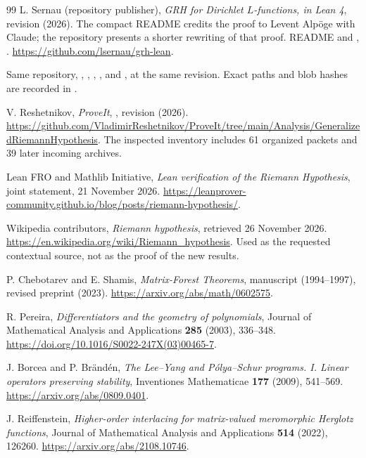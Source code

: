 \begin{thebibliography}{99}
L. Sernau (repository publisher), \emph{GRH for Dirichlet $L$-functions, in Lean 4},
revision  (2026).
The compact README credits the proof to Levent Alp\"oge with Claude;
the repository presents a shorter rewriting of that proof.
README and , .
\url{https://github.com/lsernau/grh-lean}.

Same repository, , ,
,
, and
, at the same revision.
Exact paths and blob hashes are recorded in .

V. Reshetnikov, \emph{ProveIt}, ,
revision  (2026).
\url{https://github.com/VladimirReshetnikov/ProveIt/tree/main/Analysis/GeneralizedRiemannHypothesis}.
The inspected inventory includes 61 organized packets and 39 later incoming archives.

Lean FRO and Mathlib Initiative, \emph{Lean verification of the Riemann
Hypothesis}, joint statement, 21 November 2026.
\url{https://leanprover-community.github.io/blog/posts/riemann-hypothesis/}.

Wikipedia contributors, \emph{Riemann hypothesis}, retrieved 26 November 2026.
\url{https://en.wikipedia.org/wiki/Riemann_hypothesis}.
Used as the requested contextual source, not as the proof of the new results.

P. Chebotarev and E. Shamis, \emph{Matrix-Forest Theorems},
manuscript (1994--1997), revised preprint (2023).
\url{https://arxiv.org/abs/math/0602575}.

R. Pereira, \emph{Differentiators and the geometry of polynomials},
Journal of Mathematical Analysis and Applications \textbf{285} (2003), 336--348.
\url{https://doi.org/10.1016/S0022-247X(03)00465-7}.

J. Borcea and P. Br\"and\'en, \emph{The Lee--Yang and P\'olya--Schur
programs. I. Linear operators preserving stability},
Inventiones Mathematicae \textbf{177} (2009), 541--569.
\url{https://arxiv.org/abs/0809.0401}.

J. Reiffenstein, \emph{Higher-order interlacing for matrix-valued meromorphic
Herglotz functions}, Journal of Mathematical Analysis and Applications
\textbf{514} (2022), 126260.
\url{https://arxiv.org/abs/2108.10746}.


\end{thebibliography}
